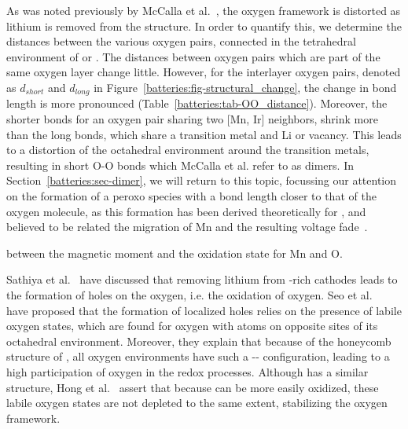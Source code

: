 \begin{refsection}
As was noted previously by McCalla et al.~\cite{McCalla2015}, the oxygen 
framework is distorted as lithium is removed from the structure. In order to 
quantify this, we determine the distances between the various oxygen pairs, 
connected in the tetrahedral environment of  or . The distances 
between oxygen pairs which are part of the same oxygen layer change little. 
However, for the interlayer oxygen pairs, denoted as $d_{short}$ and 
$d_{long}$ in Figure~\ref{batteries:fig-structural_change}, the change in bond 
length is more pronounced (Table~\ref{batteries:tab-OO_distance}). Moreover, 
the shorter bonds for an oxygen pair sharing two [Mn, Ir] neighbors, shrink 
more than the long bonds, which share a transition metal and Li or vacancy. 
This leads to a distortion of the octahedral environment around the transition 
metals, resulting in short O-O bonds which McCalla et al. refer to as dimers. 
In Section~\ref{batteries:sec-dimer}, we will return to this topic, focussing 
our attention on the formation of a peroxo species with a bond length closer 
to that of the oxygen molecule, as this formation has been derived 
theoretically for , and believed to be related the migration of Mn 
and the resulting voltage fade~\cite{Chen2016}. 
 
between the magnetic moment and the oxidation state for Mn and O.  
 

 \label{batteries:sec-oxidation}
 
Sathiya et al.~\cite{Sathiya2013} have discussed that removing lithium from 
-rich cathodes leads to the formation of holes on the oxygen, i.e. the 
oxidation of oxygen. Seo et al.~\cite{Seo2016} have proposed that the 
formation of localized holes relies on the presence of labile oxygen states, 
which are found for oxygen with  atoms on opposite sites of its 
octahedral environment. Moreover, they explain that because of the honeycomb 
structure of , all oxygen environments have such a 
-- configuration, leading to a high participation of 
oxygen in the redox processes. Although  has a similar structure, 
Hong et al.~\cite{Hong2019} assert that because  can be more 
easily oxidized, these labile oxygen states are not depleted to the same 
extent, stabilizing the oxygen framework. 
 

\end{refsection}
